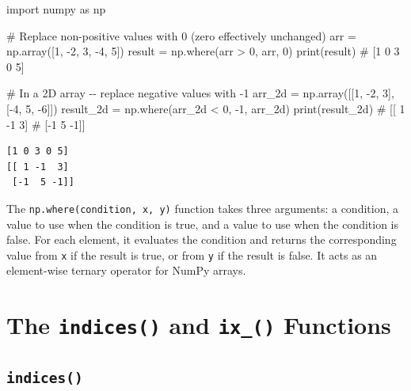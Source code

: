 \documentclass[
  english,
  letterpaper,
  DIV=11,
  numbers=noendperiod]{scrreprt}
\newenvironment{Shaded}{\begin{snugshade}}{\end{snugshade}}
\newcommand{\BuiltInTok}[1]{\textcolor[rgb]{0.00,0.23,0.31}{#1}}
\newcommand{\CommentTok}[1]{\textcolor[rgb]{0.37,0.37,0.37}{#1}}
\newcommand{\DecValTok}[1]{\textcolor[rgb]{0.68,0.00,0.00}{#1}}
\newcommand{\ImportTok}[1]{\textcolor[rgb]{0.00,0.46,0.62}{#1}}
\newcommand{\NormalTok}[1]{\textcolor[rgb]{0.00,0.23,0.31}{#1}}
\newcommand{\OperatorTok}[1]{\textcolor[rgb]{0.37,0.37,0.37}{#1}}
\begin{document}
\begin{Shaded}
\begin{Highlighting}[]
\ImportTok{import}\NormalTok{ numpy }\ImportTok{as}\NormalTok{ np}

\CommentTok{\# Replace non{-}positive values with 0 (zero effectively unchanged)}
\NormalTok{arr }\OperatorTok{=}\NormalTok{ np.array([}\DecValTok{1}\NormalTok{, }\OperatorTok{{-}}\DecValTok{2}\NormalTok{, }\DecValTok{3}\NormalTok{, }\OperatorTok{{-}}\DecValTok{4}\NormalTok{, }\DecValTok{5}\NormalTok{])}
\NormalTok{result }\OperatorTok{=}\NormalTok{ np.where(arr }\OperatorTok{\textgreater{}} \DecValTok{0}\NormalTok{, arr, }\DecValTok{0}\NormalTok{)}
\BuiltInTok{print}\NormalTok{(result)  }\CommentTok{\# [1 0 3 0 5]}

\CommentTok{\# In a 2D array {-}{-} replace negative values with {-}1}
\NormalTok{arr\_2d }\OperatorTok{=}\NormalTok{ np.array([[}\DecValTok{1}\NormalTok{, }\OperatorTok{{-}}\DecValTok{2}\NormalTok{, }\DecValTok{3}\NormalTok{], [}\OperatorTok{{-}}\DecValTok{4}\NormalTok{, }\DecValTok{5}\NormalTok{, }\OperatorTok{{-}}\DecValTok{6}\NormalTok{]])}
\NormalTok{result\_2d }\OperatorTok{=}\NormalTok{ np.where(arr\_2d }\OperatorTok{\textless{}} \DecValTok{0}\NormalTok{, }\OperatorTok{{-}}\DecValTok{1}\NormalTok{, arr\_2d)}
\BuiltInTok{print}\NormalTok{(result\_2d)}
\CommentTok{\# [[ 1 {-}1  3]}
\CommentTok{\#  [{-}1  5 {-}1]]}
\end{Highlighting}
\end{Shaded}

\begin{verbatim}
[1 0 3 0 5]
[[ 1 -1  3]
 [-1  5 -1]]
\end{verbatim}

The \texttt{np.where(condition,\ x,\ y)} function takes three arguments:
a condition, a value to use when the condition is true, and a value to
use when the condition is false. For each element, it evaluates the
condition and returns the corresponding value from \texttt{x} if the
result is true, or from \texttt{y} if the result is false. It acts as an
element-wise ternary operator for NumPy arrays.

\section{\texorpdfstring{The \texttt{indices()} and \texttt{ix\_()}
Functions}{The indices() and ix\_() Functions}}\label{the-indices-and-ix_-functions}

\subsection{\texorpdfstring{\texttt{indices()}}{indices()}}\label{indices}
\end{document}
